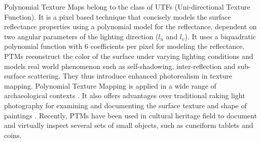 Polynomial Texture Maps \cite{C4} belong to the class of UTFs (Uni-directional Texture Function). It is a pixel
based technique that concisely models the surface reflectance properties using a
polynomial model for the reflectance, dependent on two angular parameters of the
lighting direction ($l_u$ and $l_v$). It uses a
biquadratic polynomial function with 6 coefficients per pixel for modeling the
reflectance. PTMs reconstruct the color of the surface under varying
lighting conditions and models real world phenomenon such as
self-shadowing, inter-reflection and sub-surface scattering. They thus introduce
enhanced photorealism in texture mapping.
Polynomial Texture Mapping is applied in a wide
range of archaeological contexts \cite{C14}. 
It also offers advantages over traditional raking
light photography for examining and
documenting the surface texture and
shape of paintings \cite{C13}.
Recently, PTMs have been used in cultural heritage field to document and virtually inspect 
several sets of small objects, such as cuneiform tablets and coins.





